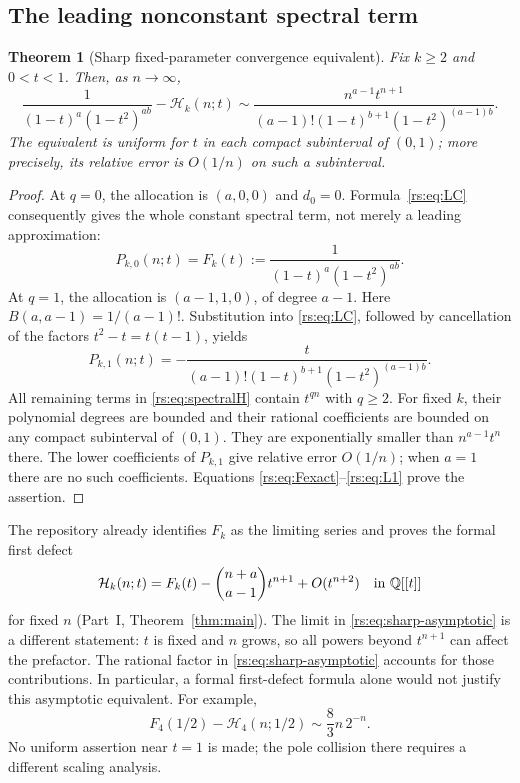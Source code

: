 \documentclass[11pt]{article}
\newtheorem{theorem}{Theorem}[section]
\theoremstyle{definition}
\theoremstyle{remark}
\newcommand{\Q}{\mathbb Q}
\newcommand{\Ht}{\mathcal H}
\theoremstyle{definition}
\theoremstyle{plain}
\numberwithin{equation}{section}
\begin{document}
\subsection{The leading nonconstant spectral term}
\begin{theorem}[Sharp fixed-parameter convergence equivalent]
\label{rs:thm:asymptotic}
Fix $k\ge2$ and $0<t<1$. Then, as $n\to\infty$,
\begin{equation}
 \boxed{\displaystyle
 \frac1{(1-t)^a(1-t^2)^{ab}}-\Ht_k(n;t)
 \sim
 \frac{n^{a-1}t^{n+1}}
 {(a-1)!(1-t)^{b+1}(1-t^2)^{(a-1)b}}.}
 \label{rs:eq:sharp-asymptotic}
\end{equation}
The equivalent is uniform for $t$ in each compact subinterval of $(0,1)$;
more precisely, its relative error is $O(1/n)$ on such a subinterval.
\end{theorem}
\begin{proof}
At $q=0$, the allocation is $(a,0,0)$ and $d_0=0$.
Formula~\eqref{rs:eq:LC} consequently gives the whole constant spectral term,
not merely a leading approximation:
\begin{equation}
 P_{k,0}(n;t)=F_k(t):=\frac1{(1-t)^a(1-t^2)^{ab}}.
 \label{rs:eq:Fexact}
\end{equation}
At $q=1$, the allocation is $(a-1,1,0)$, of degree $a-1$.
Here $B(a,a-1)=1/(a-1)!$. Substitution into \eqref{rs:eq:LC}, followed by
cancellation of the factors $t^2-t=t(t-1)$, yields
\begin{equation}
 [n^{a-1}]P_{k,1}(n;t)
 =-\frac{t}{(a-1)!(1-t)^{b+1}(1-t^2)^{(a-1)b}}.
 \label{rs:eq:L1}
\end{equation}
All remaining terms in \eqref{rs:eq:spectralH} contain $t^{qn}$ with $q\ge2$.
For fixed $k$, their polynomial degrees are bounded and their rational
coefficients are bounded on any compact subinterval of $(0,1)$.
They are exponentially smaller than $n^{a-1}t^n$ there.
The lower coefficients of $P_{k,1}$ give relative error $O(1/n)$;
when $a=1$ there are no such coefficients. Equations
\eqref{rs:eq:Fexact}--\eqref{rs:eq:L1} prove the assertion.
\end{proof}

The repository already identifies $F_k$ as the limiting series and proves
the formal first defect
\begin{equation}
 \Ht_k(n;t)=F_k(t)-\binom{n+a}{a-1}t^{n+1}+O(t^{n+2})
 \quad\hbox{in }\Q[[t]]
 \label{rs:eq:old-defect}
\end{equation}
for fixed $n$ (Part~I, Theorem~\ref{thm:main}). The limit in
\eqref{rs:eq:sharp-asymptotic} is a different statement: $t$ is fixed and
$n$ grows, so all powers beyond $t^{n+1}$ can affect the prefactor.
The rational factor in \eqref{rs:eq:sharp-asymptotic} accounts for those
contributions. In particular, a formal first-defect formula alone would
not justify this asymptotic equivalent. For example,
\[
 F_4(1/2)-\Ht_4(n;1/2)\sim\frac83 n\,2^{-n}.
\]
No uniform assertion near $t=1$ is made; the pole collision there requires
a different scaling analysis.
\end{document}
